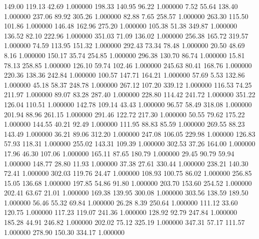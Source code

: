     149.00    119.13     42.69  1.000000
    198.33    140.95     96.22  1.000000
      7.52     55.64    138.40  1.000000
    237.06     89.92    305.26  1.000000
     82.88      7.65    258.57  1.000000
    263.30    115.50    101.86  1.000000
    146.48    162.96    275.20  1.000000
    105.38     51.38    349.87  1.000000
    136.52     82.10    222.96  1.000000
    351.03     71.09    136.02  1.000000
    256.38    165.72    319.57  1.000000
     74.59    113.95    151.32  1.000000
    292.43     73.34     78.48  1.000000
     20.50     48.69      8.16  1.000000
    150.17     35.74    254.85  1.000000
    296.38    130.70     86.74  1.000000
     15.81     78.13    258.85  1.000000
    126.10     59.74    102.46  1.000000
    245.63     80.41    168.76  1.000000
    220.36    138.36    242.84  1.000000
    100.57    147.71    164.21  1.000000
     57.69      5.53    132.86  1.000000
     45.18     58.37    248.78  1.000000
    267.12    107.20    339.12  1.000000
    116.53     74.25    211.97  1.000000
     89.07     83.28    287.40  1.000000
    228.80    114.42    241.72  1.000000
    351.22    126.04    110.51  1.000000
    142.78    109.14     43.43  1.000000
     96.57     58.49    318.08  1.000000
    201.94     88.96    261.15  1.000000
    291.46    122.72    217.30  1.000000
     50.55     79.62    175.22  1.000000
    144.55     40.21     92.49  1.000000
    111.95     88.83     85.59  1.000000
    269.55     88.23    143.49  1.000000
     36.21     89.06    312.20  1.000000
    247.08    106.05    229.98  1.000000
    126.83     57.93    118.31  1.000000
    255.02    143.31    109.39  1.000000
    302.53     37.26    164.00  1.000000
     17.96     46.30    107.06  1.000000
    165.11     87.65    180.79  1.000000
     29.45     90.79     59.94  1.000000
    148.77     28.80     11.93  1.000000
     37.38     27.61    330.44  1.000000
    238.21    140.30     72.41  1.000000
    302.03    119.76     24.47  1.000000
    108.93    100.75     86.02  1.000000
    256.85     15.05    136.68  1.000000
    197.85     54.86     91.80  1.000000
    203.70    153.60    254.52  1.000000
    202.41     63.67     21.01  1.000000
    169.38    139.95    300.08  1.000000
    303.56    138.59    189.50  1.000000
     56.46     55.32     69.84  1.000000
     26.28      8.39    250.64  1.000000
    111.12     33.60    120.75  1.000000
    117.23    119.07    241.36  1.000000
    128.92     92.79    247.84  1.000000
    185.28     44.91    246.82  1.000000
    202.02     75.12    325.19  1.000000
    347.31     57.17    111.57  1.000000
    278.90    150.30    334.17  1.000000

